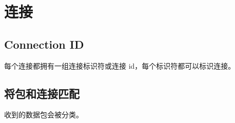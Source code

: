 \section{连接}
\label{sec:connections}
\subsection{Connection ID}
每个连接都拥有一组连接标识符或连接 id，每个标识符都可以标识连接。

\subsection{将包和连接匹配}
\label{subsec:match-packet-connection}
收到的数据包会被分类。
